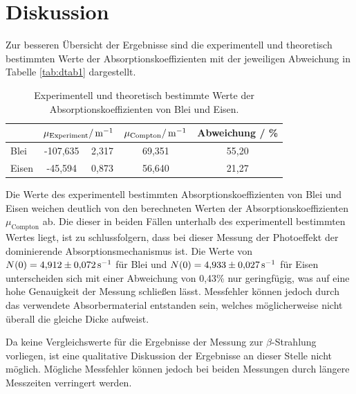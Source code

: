 \section{Diskussion}
Zur besseren Übersicht der Ergebnisse sind die experimentell und theoretisch bestimmten Werte der Absorptionskoeffizienten
mit der jeweiligen Abweichung in Tabelle \ref{tab:dtab1} dargestellt.
\FloatBarrier
\begin{table}[h]
    \centering
    \caption{Experimentell und theoretisch bestimmte Werte der Absorptionskoeffizienten von Blei und Eisen.}
    \label{tab:atab2}
    \begin{tabular}{l S[table-format=3.3] @{${}\pm{}$} S[table-format=1.4] S[table-format=2.3] S[table-format=2.2]}
        \toprule
        {} &  & {$\mu_\text{Compton} / \, \si[per-mode=reciprocal]{\per\meter}$} & {Abweichung / \%} \\
        \midrule
        {Blei}  &  -107,635 & 2,317 & 69,351 & 55,20 \\
        {Eisen} &  -45,594  & 0,873 & 56,640 & 21,27 \\
        \bottomrule
    \end{tabular}
\end{table}
\FloatBarrier
\noindent
Die Werte des experimentell bestimmten Absorptionskoeffizienten von Blei und Eisen weichen deutlich von den berechneten
Werten der Absorptionskoeffizienten $\mu_\text{Compton}$ ab. Die dieser in beiden Fällen unterhalb des experimentell 
bestimmten Wertes liegt, ist zu schlussfolgern, dass bei dieser Messung der Photoeffekt der dominierende Absorptionsmechanismus ist. 
Die Werte von $N(0) = \num{4,912(72)} \, \si[per-mode=reciprocal]{\per\second}$ für Blei und $N(0) = \num{4,933(27)} \, \si[per-mode=reciprocal]{\per\second}$
für Eisen unterscheiden sich mit einer Abweichung von 0,43\% nur geringfügig, was auf eine hohe Genauigkeit der Messung schließen lässt.
Messfehler können jedoch durch das verwendete Absorbermaterial entstanden sein, welches möglicherweise nicht überall
die gleiche Dicke aufweist. 

Da keine Vergleichswerte für die Ergebnisse der Messung zur $\beta$-Strahlung vorliegen, ist eine qualitative Diskussion
der Ergebnisse an dieser Stelle nicht möglich. Mögliche Messfehler können jedoch bei beiden Messungen durch längere
Messzeiten verringert werden.

\nocite{wingate}   
\nocite{*}      
\printbibliography

